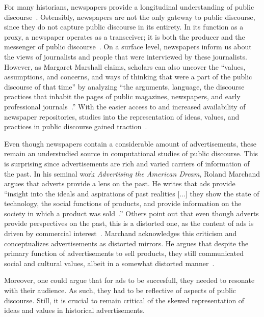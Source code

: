 \documentclass[USenglish]{article}
\begin{document}
For many historians, newspapers provide a longitudinal understanding of public discourse~\cite{postman_amusing_2005,vree_nederlandse_1989}. Ostensibly, newspapers are not the only gateway to public discourse, since they do not capture public discourse in its entirety. In its function as a proxy, a newspaper operates as a transceiver; it is both the producer and the messenger of public discourse~\cite[17-8]{schudson_power_1982}. On a surface level, newspapers inform us about the views of journalists and people that were interviewed by these journalists. However, as Margaret Marshall claims, scholars can also uncover the ``values, assumptions, and concerns, and ways of thinking that were a part of the public discourse of that time'' by analyzing ``the arguments, language, the discourse practices that inhabit the pages of public magazines, newspapers, and early professional journals~\cite[8]{marshall_contesting_1995}.'' With the easier access to and increased availability of newspaper repositories, studies into the representation of ideas, values, and practices in public discourse gained traction~\cite{van_eijnatten_eurocentric_2019,daems_workers_2019}. 

Even though newspapers contain a considerable amount of advertisements, these remain an understudied source in computational studies of public discourse. This is surprising since advertisements are rich and varied carriers of information of the past. In his seminal work \textit{Advertising the American Dream}, Roland Marchand argues that adverts provide a lens on the past. He writes that ads provide ``insight into the ideals and aspirations of past realities [...] they show the state of technology, the social functions of products, and provide information on the society in which a product was sold~\cite{marchand_advertising_1985}.'' Others point out that even though adverts provide perspectives on the past, this is a distorted one, as the content of ads is driven by commercial interest~\cite{fox_mirror_1997}. 
%
Marchand acknowledges this criticism and conceptualizes advertisements as distorted mirrors. He argues that despite the primary function of advertisements to sell products, they still communicated social and cultural values, albeit in a somewhat distorted manner~\cite{marchand_advertising_1985,lears_fables_1994}. 

Moreover, one could argue that for ads to be succesfull, they needed to resonate with their audience. As such, they had to be reflective of aspects of public discourse. Still, it is crucial to remain critical of the skewed representation of ideas and values in historical advertisements. 
\end{document}
